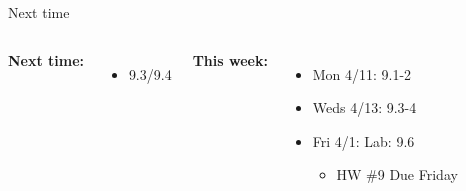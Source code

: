 \documentclass[aspectratio=169,usenames,dvipsnames]{beamer}
\begin{document}
\begin{frame}[t]{Next time}


\begin{columns}
\centering

\textbf{Next time:}

\begin{itemize}
	\item 9.3/9.4
\end{itemize}

\centering

\textbf{This week:}
\begin{itemize}
\item Mon 4/11: 9.1-2
\item Weds 4/13: 9.3-4
\item Fri 4/1: Lab: 9.6
\begin{itemize}
	\item HW \#9 Due Friday
\end{itemize}

\end{itemize}
	\end{columns}

\end{frame}
\end{document}
